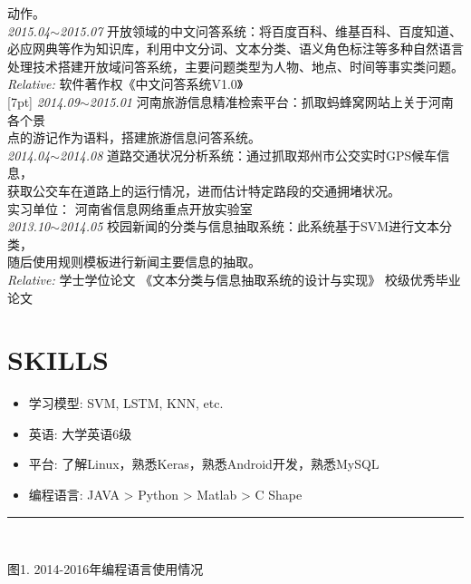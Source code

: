\documentclass[line, margin]{res}
\newcommand{\xiaowu}{\fontsize{9pt}{15.75pt}\selectfont} %
\begin{document}
\begin{resume}
{{ 动作。}\\
[7pt]
 {\sl 2015.04$\sim$2015.07} 开放领域的中文问答系统：{ 将百度百科、维基百科、百度知道、\\
 必应网典等作为知识库，利用中文分词、文本分类、语义角色标注等多种自然语言\\
 处理技术搭建开放域问答系统，主要问题类型为人物、地点、时间等事实类问题。}\\ 
 {\sl\xiaowu Relative:} {\xiaowu 软件著作权《中文问答系统V1.0》} \\
[7pt]
 {\sl 2014.09$\sim$2015.01} 河南旅游信息精准检索平台：{ 抓取蚂蜂窝网站上关于河南各个景\\
 点的游记作为语料，搭建旅游信息问答系统。} \\
[7pt]
 {\sl 2014.04$\sim$2014.08} 道路交通状况分析系统：{ 通过抓取郑州市公交实时GPS候车信息，\\
 获取公交车在道路上的运行情况，进而估计特定路段的交通拥堵状况。 \\
 {\xiaowu 实习单位： 河南省信息网络重点开放实验室} }\\
[7pt]
 {\sl 2013.10$\sim$2014.05} 校园新闻的分类与信息抽取系统：{ 此系统基于SVM进行文本分类，\\
 随后使用规则模板进行新闻主要信息的抽取。}\\
   {\sl\xiaowu Relative:} {\xiaowu 学士学位论文 《文本分类与信息抽取系统的设计与实现》 校级优秀毕业论文}} \\
 
\section{SKILLS}
\begin{itemize}
\item { 学习模型: }SVM, LSTM, KNN, etc.
\item { 英语: 大学英语6级}
\item { 平台: 了解Linux，熟悉Keras，熟悉Android开发，熟悉MySQL}
\item { 编程语言: }JAVA > Python > Matlab > C Shape
\end{itemize}

\rule{13.0cm}{0.05em} \\
\begin{center}
{\xiaowu 图1. 2014-2016年编程语言使用情况}
\end{center}


\end{resume}
\end{document}
